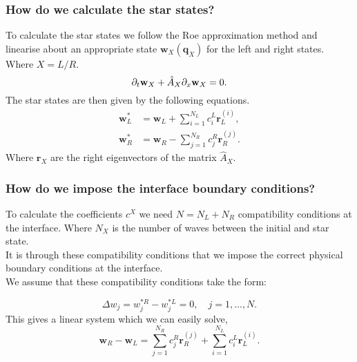 \documentclass{beamer}
\begin{document}
\begin{frame}
\frametitle{How do we calculate the star states?}
To calculate the star states we follow the Roe approximation method and linearise about an appropriate state $\mathbf{w}_X(\mathbf{q}_X)$ for the left and right states. Where $X = L/R$.
\begin{equation}
\partial_t\mathbf{w}_X + \hat{A}_X\partial_{\mathnormal{x}}\mathbf{w}_X = 0.
\end{equation}
The star states are then given by the following equations.
\begin{align}
\mathbf{w}^*_L &= \mathbf{w}_L+\sum^{N_L}_{i=1}c^L_{i}\mathbf{r}^{(i)}_L,\\
\mathbf{w}^*_R &= \mathbf{w}_R-\sum^{N_R}_{j=1}c^R_{j}\mathbf{r}^{(j)}_R.
\end{align}
Where $\mathbf{r}_X$ are the right eigenvectors of the matrix $\hat{A}_X$.
\end{frame}

\begin{frame}
\frametitle{How do we impose the interface boundary conditions?}
To calculate the coefficients $c^X$ we need  $N = N_L + N_R$ compatibility conditions at the interface. Where $N_X$ is the number of waves between the initial and star state.\\
It is through these compatibility conditions that we impose the correct physical boundary conditions at the interface.\\
We assume that these compatibility conditions take the form:

\begin{equation}
\Delta w_j = w^{*R}_j-w^{*L}_j = 0, \quad j = 1,\dots, N.
\end{equation}
This gives a linear system which we can easily solve,
\begin{equation}
\mathbf{w}_R - \mathbf{w}_L = \sum^{N_R}_{j=1}c^R_{j}\mathbf{r}^{(j)}_R +  \sum^{N_L}_{i=1}c^L_{i}\mathbf{r}^{(i)}_L.
\end{equation}
\end{frame}

\end{document}
